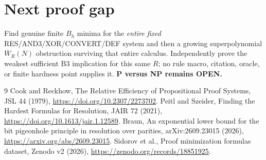 \documentclass[11pt]{article}
\begin{document}
\section{Next proof gap}
Find genuine finite $B_h$ minima for the \emph{entire fixed} RES/AND3/XOR/CONVERT/DEF system and then a growing superpolynomial $\overline W_R(N)$ obstruction surviving that entire calculus. Independently prove the weakest sufficient B3 implication for this same $R$; no rule macro, citation, oracle, or finite hardness point supplies it. \textbf{P versus NP remains OPEN.}
\begin{thebibliography}{9}
 Cook and Reckhow, The Relative Efficiency of Propositional Proof Systems, JSL 44 (1979), \url{https://doi.org/10.2307/2273702}.
 Peitl and Szeider, Finding the Hardest Formulas for Resolution, JAIR 72 (2021), \url{https://doi.org/10.1613/jair.1.12589}.
 Braun, An exponential lower bound for the bit pigeonhole principle in resolution over parities, arXiv:2609.23015 (2026), \url{https://arxiv.org/abs/2609.23015}.
 Sidorov et al., Proof minimization formulas dataset, Zenodo v2 (2026), \url{https://zenodo.org/records/18851925}.
\end{thebibliography}
\end{document}
